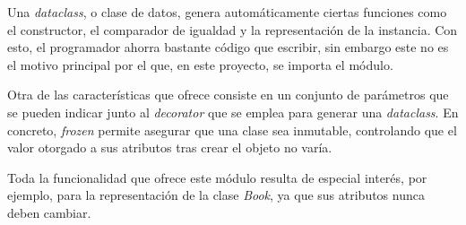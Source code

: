 Una \textit{dataclass}, o clase de datos, genera automáticamente ciertas funciones como el constructor, el comparador de igualdad y la representación de la instancia. Con esto, el programador ahorra bastante código que escribir, sin embargo este no es el motivo principal por el que, en este proyecto, se importa el módulo.

Otra de las características que ofrece consiste en un conjunto de parámetros que se pueden indicar junto al \textit{decorator} que se emplea para generar una \textit{dataclass}. En concreto, \textit{frozen} permite asegurar que una clase sea inmutable, controlando que el valor otorgado a sus atributos tras crear el objeto no varía.

Toda la funcionalidad que ofrece este módulo resulta de especial interés, por ejemplo, para la representación de la clase \textit{Book}, ya que sus atributos nunca deben cambiar.